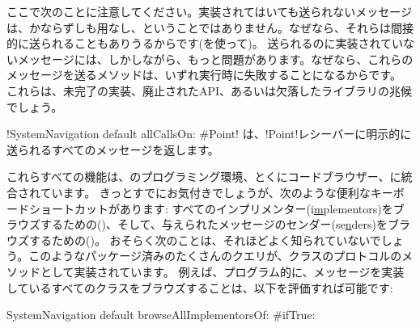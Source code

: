 \documentclass[a4paper,10pt,twoside]{book}
\begin{document}
ここで次のことに注意してください。実装されてはいても送られないメッセージは、かならずしも用なし、ということではありません。なぜなら、それらは間接的に送られることもありうるからです(\eg {}を使って)。
送られるのに実装されていないメッセージには、しかしながら、もっと問題があります。なぜなら、これらのメッセージを送るメソッドは、いずれ実行時に失敗することになるからです。
これらは、未完了の実装、廃止されたAPI、あるいは欠落したライブラリの兆候でしょう。

\ct!SystemNavigation default allCallsOn: #Point! は、\ct!Point!レシーバーに明示的に送られるすべてのメッセージを返します。

これらすべての機能は、\pharo のプログラミング環境、とくにコードブラウザー、に統合されています。
きっとすでにお気付きでしょうが、次のような便利なキーボードショートカットがあります: すべてのインプリメンター(i\underline{m}plementors)をブラウズするための()、そして、与えられたメッセージのセンダー(se\underline{n}ders)をブラウズするための()。
おそらく次のことは、それほどよく知られていないでしょう。このようなパッケージ済みのたくさんのクエリが、クラスのプロトコルのメソッドとして実装されています。%
例えば、プログラム的に、メッセージを実装しているすべてのクラスをブラウズすることは、以下を評価すれば可能です:
\begin{code}{}
SystemNavigation default browseAllImplementorsOf: #ifTrue:
\end{code}
\end{document}
